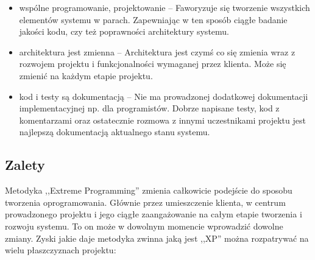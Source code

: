\begin{itemize}
\item wspólne programowanie, projektowanie -- Faworyzuje się tworzenie wszystkich elementów systemu w parach. Zapewniając w ten sposób ciągłe badanie jakości kodu, czy też poprawności architektury systemu.
\item architektura jest zmienna -- Architektura jest czymś co się zmienia wraz z rozwojem projektu i funkcjonalności wymaganej przez klienta. Może się zmienić na każdym etapie projektu.
\item kod i testy są dokumentacją -- Nie ma prowadzonej dodatkowej dokumentacji implementacyjnej np. dla programistów. Dobrze napisane testy, kod z komentarzami oraz ostatecznie rozmowa z innymi uczestnikami projektu jest najlepszą dokumentacją aktualnego stanu systemu.
\end{itemize}


\subsection{Zalety}
\label{sec:ZMTOzalety}


Metodyka ,,Extreme Programming'' zmienia całkowicie podejście do sposobu tworzenia oprogramowania. Głównie przez umieszczenie klienta, w centrum prowadzonego projektu i jego ciągłe zaangażowanie na całym etapie tworzenia i rozwoju systemu. To on może w dowolnym momencie wprowadzić dowolne zmiany. Zyski jakie daje metodyka zwinna jaką jest ,,XP'' można rozpatrywać na wielu płaszczyznach projektu:


